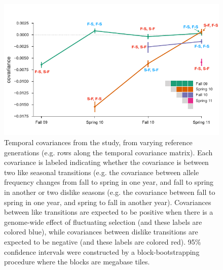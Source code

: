 \documentclass[11pt]{article}
\newcommand{\gc}[1]{{\it \color{red} #1 } }
\begin{document}

\begin{figure}[!ht]
  \centering
  \includegraphics[]{figures/bergland-covs-figure.pdf}

  \caption{Temporal covariances from the \textcite{Bergland2014-ij} study, from
    varying reference generations (e.g. rows along the temporal covariance
    matrix). Each covariance is labeled indicating whether the covariance is
    between two like seasonal transitions (e.g. the covariance between allele
    frequency changes from fall to spring in one year, and fall to spring in
    another or two dislike seasons (e.g. the covariance between fall to spring
    in one year, and spring to fall in another year). Covariances between like
    transitions are expected to be positive when there is a genome-wide effect
    of fluctuating selection (and these labels are colored blue), while
    covariances between dislike transitions are expected to be negative (and
    these labels are colored red). 95\% confidence intervals were constructed
    by a block-bootstrapping procedure where the blocks are megabase tiles.}

  \label{suppfig:bergland-covs-figure}
\end{figure}



\end{document}
